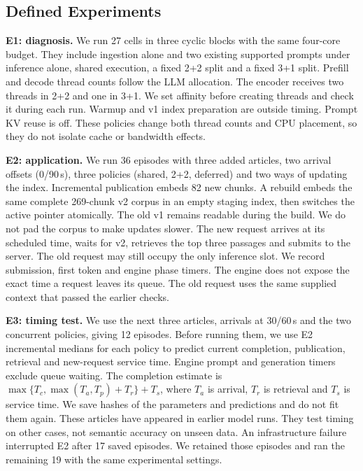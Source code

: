 \subsection{Defined Experiments}
\label{sec:budget}
\textbf{E1: diagnosis.} We run 27 cells in three cyclic blocks with the same
four-core budget. They include ingestion alone and two existing supported
prompts under inference alone, shared execution, a fixed 2+2 split and a fixed
3+1 split. Prefill and decode thread counts follow the LLM allocation. The
encoder receives two threads in 2+2 and one in 3+1. We set affinity before
creating threads and check it during each run. Warmup and v1 index preparation
are outside timing. Prompt KV reuse is off. These policies change both thread
counts and CPU placement, so they do not isolate cache or bandwidth effects.

\textbf{E2: application.} We run 36 episodes with three added articles, two
arrival offsets (0/90\,s), three policies (shared, 2+2, deferred) and two ways
of updating the index. Incremental publication embeds 82 new chunks. A rebuild
embeds the same complete 269-chunk v2 corpus in an empty staging index, then
switches the active pointer atomically. The old v1 remains readable during
the build. We do not pad the corpus to make updates slower.
The new request arrives at its scheduled time, waits for v2, retrieves the
top three passages and submits to the server. The old request may still occupy
the only inference slot. We record submission, first token and engine phase
timers. The engine does not expose the exact time a request leaves its queue.
The old request uses the same supplied context that passed the earlier checks.

\textbf{E3: timing test.} We use the next three articles, arrivals at 30/60\,s
and the two concurrent policies, giving 12 episodes. Before running them, we
use E2 incremental medians for each policy to predict current completion,
publication, retrieval and new-request service time. Engine prompt and
generation timers exclude queue waiting. The completion estimate is
$\max\{T_c,\max(T_a,T_p)+T_r\}+T_s$, where $T_a$ is arrival, $T_r$ is retrieval
and $T_s$ is service time. We save hashes of the parameters and predictions
and do not fit them again. These articles have appeared in earlier model
runs. They test timing on other cases, not semantic accuracy on unseen data.
An infrastructure failure interrupted E2 after 17 saved episodes. We retained
those episodes and ran the remaining 19 with the same experimental settings.
